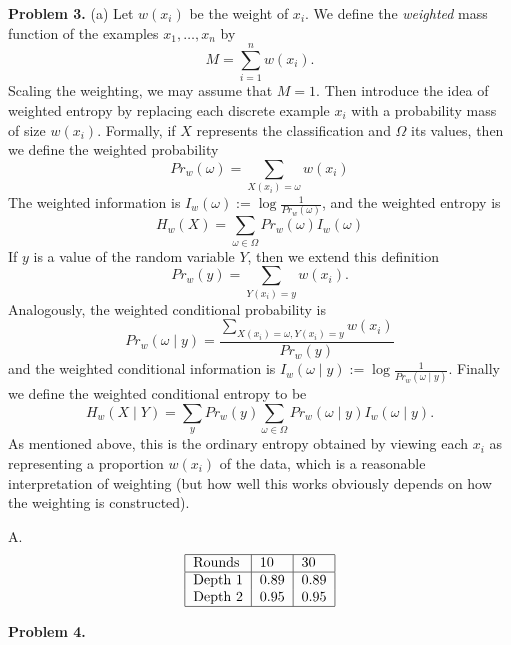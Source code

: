 \documentclass[12pt]{amsart}
\theoremstyle{remark}
\begin{document}
\noindent \textbf{Problem 3.} (a)  Let $w(x_i)$ be the weight of $x_i$. We define the \emph{weighted} mass function of the examples $x_1, \ldots, x_n$ by 
\[
M = \sum_{i=1}^n w(x_i). 
\]
Scaling the weighting, we may assume that $M=1$. Then introduce the idea of weighted entropy by replacing each discrete example $x_i$ with a probability mass of size $w(x_i)$. Formally, if $X$ represents the classification and $\Omega$ its values, then we define the weighted probability 
\[
Pr_w(\omega) = \sum_{X(x_i) = \omega} w(x_i) 
\]
The weighted information is $I_w(\omega)  := \log \frac{1}{Pr_w(\omega)}$, and the weighted entropy is 
\[
H_w(X) = \sum_{\omega \in \Omega} Pr_w(\omega) I_w(\omega)
\]
If $y$ is a value of the random variable $Y$, then we extend this definition 
\[
Pr_w(y) = \sum_{Y(x_i) = y} w(x_i).
\]
Analogously, the weighted conditional probability is 
\[
Pr_w(\omega \mid y) =\frac{ \sum_{X(x_i) = \omega, Y(x_i) = y} w(x_i)}{Pr_w(y)}
\]
and the weighted conditional information is $I_w(\omega \mid y ) := \log \frac{1}{Pr_w(\omega \mid y)}$. 
Finally we define the weighted conditional entropy to be  
\[
H_w(X \mid Y) = \sum_y Pr_w(y) \sum_{\omega \in \Omega} Pr_w(\omega \mid y) I_w(\omega \mid y).
\]
As mentioned above, this is the ordinary entropy obtained by viewing each $x_i$ as representing a proportion $w(x_i)$ of the data, which is a reasonable interpretation of weighting (but how well this works obviously depends on how the weighting is constructed). 

A. 
\[
\begin{tabular}{|l|l|l|l|}
\hline
 Rounds & 10 & 30 \\
\hline
Depth 1& 0.89 &  0.89 \\
Depth 2 & 0.95 &  0.95\\
\hline
\end{tabular}
\]
\newpage

\noindent \textbf{Problem 4.} 
\end{document}
